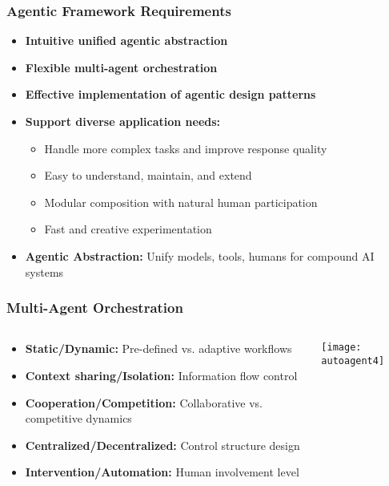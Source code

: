\begin{frame}[fragile]\frametitle{Agentic Framework Requirements}
\begin{itemize}
    \item \textbf{Intuitive unified agentic abstraction}
    \item \textbf{Flexible multi-agent orchestration}
    \item \textbf{Effective implementation of agentic design patterns}
    \item \textbf{Support diverse application needs:}
    \begin{itemize}
        \item Handle more complex tasks and improve response quality
        \item Easy to understand, maintain, and extend
        \item Modular composition with natural human participation
        \item Fast and creative experimentation
    \end{itemize}
    \item \textbf{Agentic Abstraction:} Unify models, tools, humans for compound AI systems
\end{itemize}
\end{frame}

\begin{frame}[fragile]\frametitle{Multi-Agent Orchestration}
\begin{columns}
    \begin{column}[T]{0.6\linewidth}
        \begin{itemize}
            \item \textbf{Static/Dynamic:} Pre-defined vs. adaptive workflows
            \item \textbf{Context sharing/Isolation:} Information flow control
            \item \textbf{Cooperation/Competition:} Collaborative vs. competitive dynamics
            \item \textbf{Centralized/Decentralized:} Control structure design
            \item \textbf{Intervention/Automation:} Human involvement level
        \end{itemize}
    \end{column}
    \begin{column}[T]{0.4\linewidth}
        \begin{center}
        \texttt{[image: autoagent4]}
        \end{center}
    \end{column}
\end{columns}
\end{frame}

